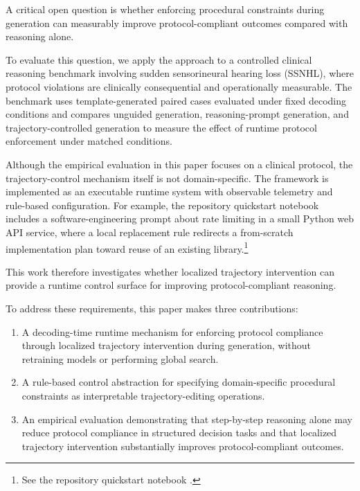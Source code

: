 \documentclass[twocolumn]{article}
\begin{document}
A critical open question is whether enforcing procedural constraints during
generation can measurably improve protocol-compliant outcomes compared with
reasoning alone.

To evaluate this question, we apply the approach to a controlled clinical
reasoning benchmark involving sudden sensorineural hearing loss (SSNHL), where
protocol violations are clinically consequential and operationally measurable.
The benchmark uses template-generated paired cases evaluated under fixed decoding
conditions and compares
unguided generation, reasoning-prompt generation, and trajectory-controlled
generation to measure the effect of runtime protocol enforcement under matched
conditions.

Although the empirical evaluation in this paper focuses on a clinical protocol,
the trajectory-control mechanism itself is not domain-specific. The framework is
implemented as an executable runtime system with observable telemetry and
rule-based configuration. For example, the repository quickstart notebook
includes a software-engineering prompt about rate limiting in a small Python web
API service, where a local replacement rule redirects a from-scratch
implementation plan toward reuse of an existing library.\footnote{See the
repository quickstart notebook .}

This work therefore investigates whether localized trajectory intervention can
provide a runtime control surface for improving protocol-compliant reasoning.

To address these requirements, this paper makes three contributions:

\begin{enumerate}[leftmargin=*,itemsep=0.2em]

  \item A decoding-time runtime mechanism for enforcing protocol compliance
    through localized trajectory intervention during generation, without
    retraining models or performing global search.

  \item A rule-based control abstraction for specifying domain-specific
    procedural constraints as interpretable trajectory-editing operations.

  \item An empirical evaluation demonstrating that step-by-step reasoning alone
    may reduce protocol compliance in structured decision tasks and that
    localized trajectory intervention substantially improves protocol-compliant
    outcomes.

\end{enumerate}
\end{document}

